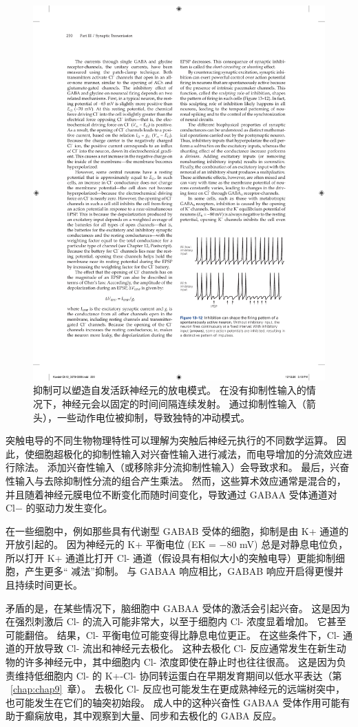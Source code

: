 \begin{figure}[htbp]
	\centering
	\includegraphics[width=0.5\linewidth]{chap13/fig_13_12}
	\caption{抑制可以塑造自发活跃神经元的放电模式。 在没有抑制性输入的情况下，神经元会以固定的时间间隔连续发射。 通过抑制性输入（箭头），一些动作电位被抑制，导致独特的冲动模式。}
	\label{fig:13_12}
\end{figure}


突触电导的不同生物物理特性可以理解为突触后神经元执行的不同数学运算。
因此，使细胞超极化的抑制性输入对兴奋性输入进行减法，而电导增加的分流效应进行除法。
添加兴奋性输入（或移除非分流抑制性输入）会导致求和。
最后，兴奋性输入与去除抑制性分流的组合产生乘法。
然而，这些算术效应通常是混合的，并且随着神经元膜电位不断变化而随时间变化，导致通过 GABAA 受体通道对 Cl− 的驱动力发生变化。


在一些细胞中，例如那些具有代谢型 GABAB 受体的细胞，抑制是由 K+ 通道的开放引起的。
因为神经元的 K+ 平衡电位 (EK = −80 mV) 总是对静息电位负，所以打开 K+ 通道比打开 Cl- 通道（假设具有相似大小的突触电导）更能抑制细胞，产生更多“ 减法”抑制。
与 GABAA 响应相比，GABAB 响应开启得更慢并且持续时间更长。


矛盾的是，在某些情况下，脑细胞中 GABAA 受体的激活会引起兴奋。
这是因为在强烈刺激后 Cl- 的流入可能非常大，以至于细胞内 Cl- 浓度显着增加。
它甚至可能翻倍。
结果，Cl- 平衡电位可能变得比静息电位更正。
在这些条件下，Cl- 通道的开放导致 Cl- 流出和神经元去极化。
这种去极化 Cl- 反应通常发生在新生动物的许多神经元中，其中细胞内 Cl- 浓度即使在静止时也往往很高。
这是因为负责维持低细胞内 Cl- 的 K+-Cl- 协同转运蛋白在早期发育期间以低水平表达（第 ~\ref{chap:chap9}~章）。
去极化 Cl- 反应也可能发生在更成熟神经元的远端树突中，也可能发生在它们的轴突初始段。
成人中的这种兴奋性 GABAA 受体作用可能有助于癫痫放电，其中观察到大量、同步和去极化的 GABA 反应。



